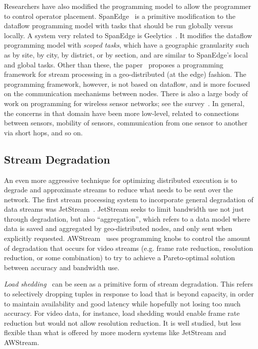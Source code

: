 Researchers have also modified the programming model to allow the programmer to control operator placement.
SpanEdge~\cite{sajjad2016spanedge} is a primitive modification to the dataflow programming model with tasks that should be run globally versus locally.
A system very related to SpanEdge is Geelytics~\cite{cheng2015geelytics}.
It modifies the dataflow programming model with \emph{scoped tasks}, which have a geographic granularity such as by site, by city, by district, or by section, and are similar to SpanEdge's local and global tasks.
Other than these, the paper~\cite{renart2017datadrivenstreamedge} proposes a programming framework for stream processing in a geo-distributed (at the edge) fashion. The programming framework, however, is not based on dataflow, and is more focused on the communication mechanisms between nodes. There is also a large body of work on programming for wireless sensor networks; see the survey~\cite{mottola2011programming-wsn}. In general, the concerns in that domain have been more low-level, related to connections between sensors, mobility of sensors, communication from one sensor to another via short hops, and so on.

\subsection{Stream Degradation}

An even more aggressive technique for optimizing distributed execution is to degrade and approximate streams to reduce what needs to be sent over the network.
The first stream processing system to incorporate general degradation of data streams was JetStream~\cite{rabkin2014jetstream}.
JetStream seeks to limit bandwidth use not just through degradation, but also ``aggregation'', which refers to a data model where data is saved and aggregated by geo-distributed nodes, and only sent when explicitly requested.
AWStream~\cite{zhang2018awstream} uses programming knobs to control the amount of degradation that occurs for video streams (e.g. frame rate reduction, resolution reduction, or some combination) to try to achieve a Pareto-optimal solution between accuracy and bandwidth use.

\emph{Load shedding}~\cite{tatbul2003load,tatbul2007staying} can be seen as a primitive form of stream degradation.
This refers to selectively dropping tuples in response to load that is beyond capacity, in order to maintain availability and good latency while hopefully not losing too much accuracy.
For video data, for instance, load shedding would enable frame rate reduction but would not allow resolution reduction. It is well studied, but less flexible than what is offered by more modern systems like JetStream and AWStream.
